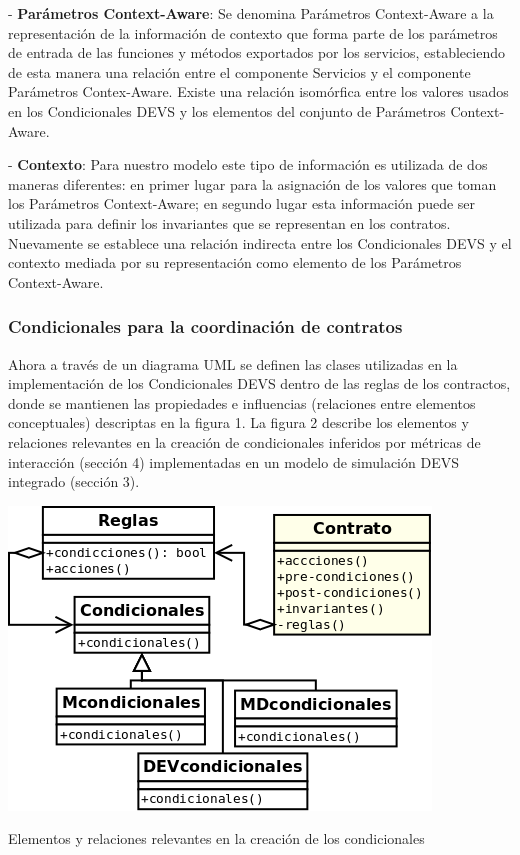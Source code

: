 - \textbf{Parámetros Context-Aware}: Se denomina Parámetros Context-Aware a la
representación de la información de contexto que forma parte de los parámetros
de entrada de las funciones y métodos exportados por los servicios,
estableciendo de esta manera una relación entre el componente Servicios y el
componente Parámetros Contex-Aware. Existe una relación isomórfica entre los
valores usados en los Condicionales DEVS y los elementos del conjunto de
Parámetros Context-Aware.

- \textbf{Contexto}: Para nuestro modelo este tipo de información es utilizada
de dos maneras diferentes: en primer lugar para la asignación de los valores que
toman los Parámetros Context-Aware; en segundo lugar esta información puede ser
utilizada para definir los invariantes que se representan en los contratos.
Nuevamente se establece una relación indirecta entre los Condicionales DEVS y el
contexto mediada por su representación como elemento de los Parámetros
Context-Aware.


\subsubsection{Condicionales para la coordinación de contratos}

Ahora a través de un diagrama UML se definen las clases utilizadas en la
implementación de los Condicionales DEVS dentro de las  reglas de los
contractos,   donde se mantienen las propiedades e influencias (relaciones entre
elementos conceptuales) descriptas en la figura 1.
La figura 2 describe los elementos y relaciones relevantes en la creación de
condicionales inferidos por métricas de interacción (sección 4) implementadas en
un modelo de simulación DEVS integrado (sección 3).


\begin{center}
 \includegraphics[width=5 in,totalheight=4 in] {Ch9/f2}
\end{center}
\caption{Elementos y relaciones relevantes en la creación de los condicionales}

